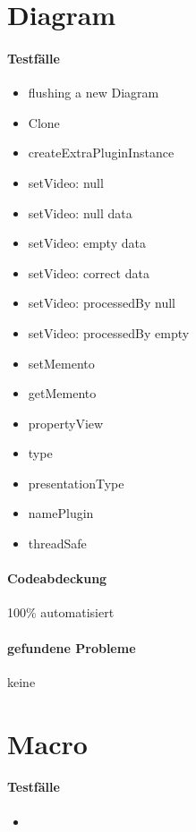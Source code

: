 \section{Diagram}

\paragraph*{Testfälle}
\begin{itemize}
\item flushing a new Diagram
\item Clone
\item createExtraPluginInstance
\item setVideo: null
\item setVideo: null data
\item setVideo: empty data
\item setVideo: correct data
\item setVideo: processedBy null
\item setVideo: processedBy empty
\item setMemento
\item getMemento
\item propertyView
\item type
\item presentationType
\item namePlugin
\item threadSafe
\end{itemize}

\paragraph*{Codeabdeckung}
100\% automatisiert

\paragraph*{gefundene Probleme}
keine







\section{Macro}

\paragraph*{Testfälle}
\begin{itemize}
\item

\end{itemize}

